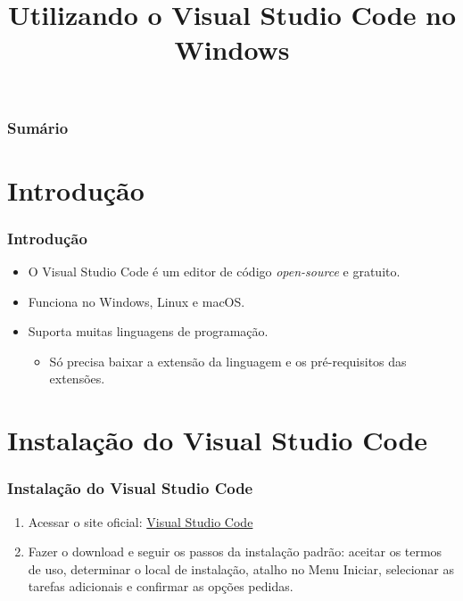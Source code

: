 \documentclass[brazilian]{beamer}
\title{Utilizando o Visual Studio Code no Windows}
\begin{document}
\frame{\titlepage}

\begin{frame}
    \frametitle{Sumário}
    \tableofcontents
\end{frame}

\section{Introdução}
\begin{frame}
    \frametitle{Introdução}
    
    \begin{itemize}
        \item O Visual Studio Code é um editor de código \textit{open-source} e gratuito.
        \item Funciona no Windows, Linux e macOS.
        \item Suporta muitas linguagens de programação.
              \begin{itemize}
                  \item Só precisa baixar a extensão da linguagem e os pré-requisitos das extensões.
              \end{itemize}
    \end{itemize}
    
\end{frame}

\section{Instalação do Visual Studio Code}

\begin{frame}
    \frametitle{Instalação do Visual Studio Code}
    \begin{enumerate}
        \item Acessar o site oficial: \href{https://code.visualstudio.com/Download}{Visual Studio Code}
        \item Fazer o download e seguir os passos da instalação padrão: aceitar os termos de uso, determinar o local de instalação, atalho no Menu Iniciar, selecionar as tarefas adicionais e confirmar as opções pedidas.
    \end{enumerate}
\end{frame}
\end{document}
